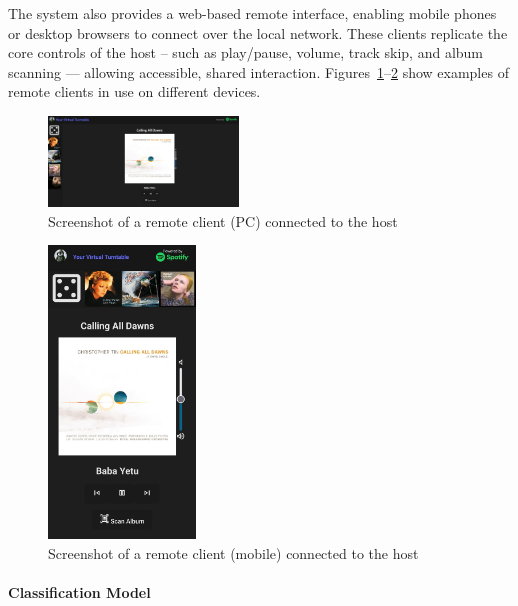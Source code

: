             The system also provides a web-based remote interface, enabling mobile phones or desktop browsers to connect over the local network. These clients replicate the core controls of the host -- such as play/pause, volume, track skip, and album scanning — allowing accessible, shared interaction. Figures~\ref{fig:laptop}–\ref{fig:phone} show examples of remote clients in use on different devices.
    
            \begin{figure}[h]
                \centering
                \includegraphics[width=0.45\textwidth]{images/screenshots/LAPTOP.png}
                \caption{Screenshot of a remote client (PC) connected to the host}
                \label{fig:laptop}
            \end{figure}
            
            \begin{figure}[h]
                \centering
                \includegraphics[width=0.35\textwidth]{images/screenshots/PHONE.jpg}
                \caption{Screenshot of a remote client (mobile) connected to the host}
                \label{fig:phone}
            \end{figure}
    
            \paragraph{Classification Model}
    
